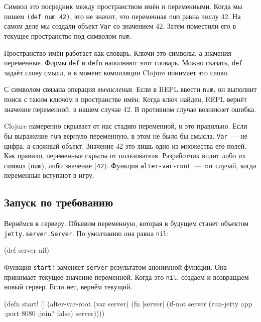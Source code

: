
Символ это посредник между пространством имён и переменными. Когда мы пишем
\verb|(def num 42)|, это не значит, что переменная \verb|num| равна числу
42. На самом деле мы создали объект \verb|Var| со значением 42. Затем
поместили его в текущее пространство под символом \verb|num|.

Пространство имён работает как словарь. Ключи это символы, а значения
переменные. Формы \verb|def| и \verb|defn| наполняют этот словарь. Можно
сказать, \verb|def| задаёт слову смысл, и в момент компиляции Clojure
понимает это слово.

С символом связана операция \emph{вычисления}. Если в REPL ввести \verb|num|,
он выполнит поиск с таким ключом в пространстве имён. Когда ключ найден, REPL
вернёт значение переменной, в нашем случае 42. В противном случае возникнет
ошибка.

Clojure намеренно скрывает от нас стадию переменной, и это правильно. Если бы
выражение \verb|num| вернуло переменную, в этом не было бы
смысла. \verb|Var|~--- не цифра, а сложный объект. Значение 42 это лишь одно
из множества его полей.  Как правило, переменные скрыты от
пользователя. Разработчик видит либо их символ (\verb|num|), либо значение
(\verb|42|). Функция \verb|alter-var-root|~--- тот случай, когда переменные
вступают в игру.

\subsection{Запуск по требованию}

Вернёмся к серверу. Объявим переменную, которая в будущем станет объектом
\verb|jetty.server.Server|. По умолчанию она равна \verb|nil|:

\begin{english}
  \begin{clojure}
(def server nil)
  \end{clojure}
\end{english}

Функция \verb|start!| заменяет \verb|server| результатом анонимной
функции. Она принимает текущее значение переменной. Когда это \verb|nil|,
создаем и возвращаем новый сервер. Если нет, вернём текущий.

\begin{english}
  \begin{clojure}
(defn start! []
  (alter-var-root
   (var server)
   (fn [server]
     (if-not server
       (run-jetty app {:port 8080 :join? false})
       server))))
  \end{clojure}
\end{english}

